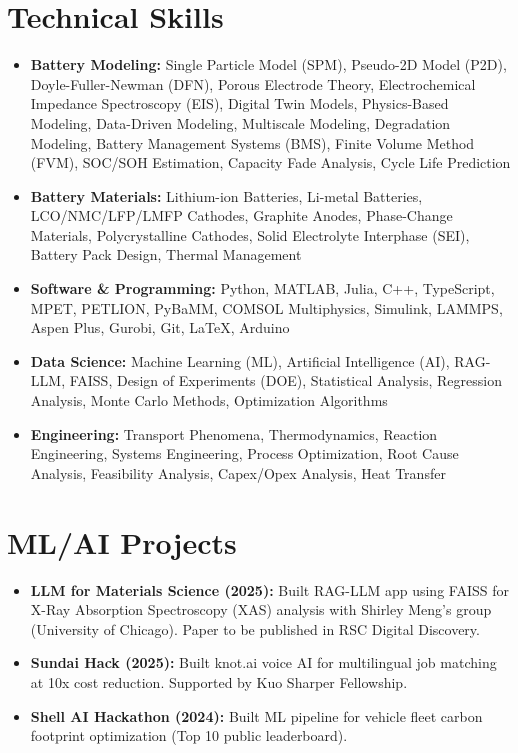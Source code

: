 \documentclass[letterpaper,11pt]{article}
\newcommand{\resumeItem}[2]{
  \item\small{
    \textbf{#1}{#2 \vspace{-2pt}}
  }
}
\newcommand{\resumeSubItem}[2]{\resumeItem{#1}{#2}\vspace{-4pt}}
\newcommand{\resumeSubHeadingListStart}{\begin{itemize}[leftmargin=*]}
\newcommand{\resumeSubHeadingListEnd}{\end{itemize}}
\begin{document}
\section{Technical Skills}
  \resumeSubHeadingListStart
    \resumeSubItem{Battery Modeling: }{Single Particle Model (SPM), Pseudo-2D Model (P2D), Doyle-Fuller-Newman (DFN), Porous Electrode Theory, Electrochemical Impedance Spectroscopy (EIS), Digital Twin Models, Physics-Based Modeling, Data-Driven Modeling, Multiscale Modeling, Degradation Modeling, Battery Management Systems (BMS), Finite Volume Method (FVM), SOC/SOH Estimation, Capacity Fade Analysis, Cycle Life Prediction}

    \resumeSubItem{Battery Materials: }{Lithium-ion Batteries, Li-metal Batteries, LCO/NMC/LFP/LMFP Cathodes, Graphite Anodes, Phase-Change Materials, Polycrystalline Cathodes, Solid Electrolyte Interphase (SEI), Battery Pack Design, Thermal Management}

    \resumeSubItem{Software \& Programming: }{Python, MATLAB, Julia, C++, TypeScript, MPET, PETLION, PyBaMM, COMSOL Multiphysics, Simulink, LAMMPS, Aspen Plus, Gurobi, Git, LaTeX, Arduino}

    \resumeSubItem{Data Science: }{Machine Learning (ML), Artificial Intelligence (AI), RAG-LLM, FAISS, Design of Experiments (DOE), Statistical Analysis, Regression Analysis, Monte Carlo Methods, Optimization Algorithms}

    \resumeSubItem{Engineering: }{Transport Phenomena, Thermodynamics, Reaction Engineering, Systems Engineering, Process Optimization, Root Cause Analysis, Feasibility Analysis, Capex/Opex Analysis, Heat Transfer}
  \resumeSubHeadingListEnd

\section{ML/AI Projects}
  \resumeSubHeadingListStart
    \resumeSubItem{LLM for Materials Science (2025): }{Built RAG-LLM app using FAISS for X-Ray Absorption Spectroscopy (XAS) analysis with Shirley Meng's group (University of Chicago). Paper to be published in RSC Digital Discovery.}

    \resumeSubItem{Sundai Hack (2025): }{Built knot.ai voice AI for multilingual job matching at 10x cost reduction. Supported by Kuo Sharper Fellowship.}

    \resumeSubItem{Shell AI Hackathon (2024): }{Built ML pipeline for vehicle fleet carbon footprint optimization (Top 10 public leaderboard).}
  \resumeSubHeadingListEnd
\end{document}
